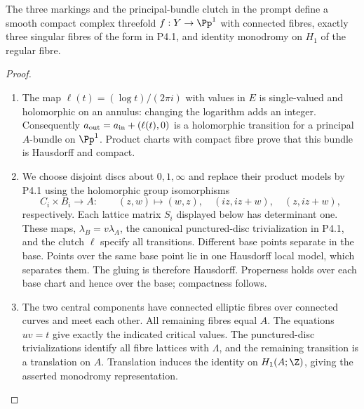 \begin{proposition}[P4.2]\hypertarget{tag-02WR}{}\label{night:P4.2}\label{stmt:P4.2}

The three markings and the principal-bundle clutch in the prompt define a
smooth compact complex threefold $f:Y\to\Pp^1$ with connected fibres,
exactly three singular fibres of the form in P4.1, and identity monodromy
on $H_1$ of the regular fibre.
\end{proposition}
\begin{proof}

\begin{enumerate}[label={$\langle1\rangle$\arabic*.},leftmargin=*]
\item The map $\ell(t)=(\log t)/(2\pi i)$ with values in $E$ is single-valued and
holomorphic on an annulus: changing the logarithm adds an integer.
Consequently $a_{\rm out}=a_{\rm in}+(\ell(t),0)$ is a holomorphic transition
for a principal $A$-bundle on $\Pp^1$. Product charts with compact fibre
prove that this bundle is Hausdorff and compact.

\item We choose disjoint discs about $0,1,\infty$ and replace their product models
by P4.1 using the holomorphic group isomorphisms
\[
 C_i\times B_i\longrightarrow A:\qquad
 (z,w)\mapsto(w,z),\quad(iz,iz+w),\quad(z,iz+w),
\]
respectively. Each lattice matrix $S_i$ displayed below has determinant
one. These maps, $\lambda_B=v\lambda_A$, the canonical punctured-disc
trivialization in P4.1, and the clutch $\ell$ specify all transitions.
Different base points separate in the base. Points over the same base
point lie in one Hausdorff local model, which separates them. The gluing is
therefore Hausdorff. Properness holds over each base chart and hence over
the base; compactness follows.

\item The two central components have connected elliptic fibres over connected
curves and meet each other. All remaining fibres equal $A$. The equations
$uv=t$ give exactly the indicated critical values. The punctured-disc
trivializations identify all fibre lattices with $\Lambda$, and the remaining
transition is a translation on $A$. Translation induces the identity on
$H_1(A;\Z)$, giving the asserted monodromy representation.

\end{enumerate}
\end{proof}